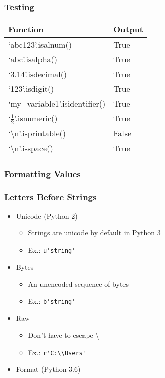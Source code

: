 \documentclass{beamer}
\begin{document}
%
%
\begin{frame}
  \frametitle{Testing}
  \begin{table}
    \begin{tabular}{l | l}
      Function & Output \\
      \hline
      `abc123'.isalnum() & True \\
      `abc'.isalpha() & True \\
      `3.14'.isdecimal() & True \\
      `123'.isdigit() & True \\
      `my\_variable1'.isidentifier() & True \\
      `$\frac{1}{2}$'.isnumeric() & True \\
      `\textbackslash n'.isprintable() & False \\
      `\textbackslash n'.isspace() & True 
    \end{tabular}
  \end{table}
\end{frame}


%
%
\begin{frame}
  \frametitle{Formatting Values} 
\end{frame}


%
%
\begin{frame}
  \frametitle{Letters Before Strings}
  \begin{itemize}
    \item Unicode (Python 2)
      \begin{itemize}
        \item Strings are unicode by default in Python 3
        \item Ex.: \lstinline{u'string'}
      \end{itemize}

    \item Bytes
      \begin{itemize}
        \item An unencoded sequence of bytes
        \item Ex.: \lstinline{b'string'}
      \end{itemize}

    \item Raw
      \begin{itemize}
	\item Don't have to escape \textbackslash
        \item Ex.: \lstinline{r'C:\\Users'}
      \end{itemize}

    \item Format (Python 3.6) 
    \end{itemize}
  \end{frame}
\end{document}

